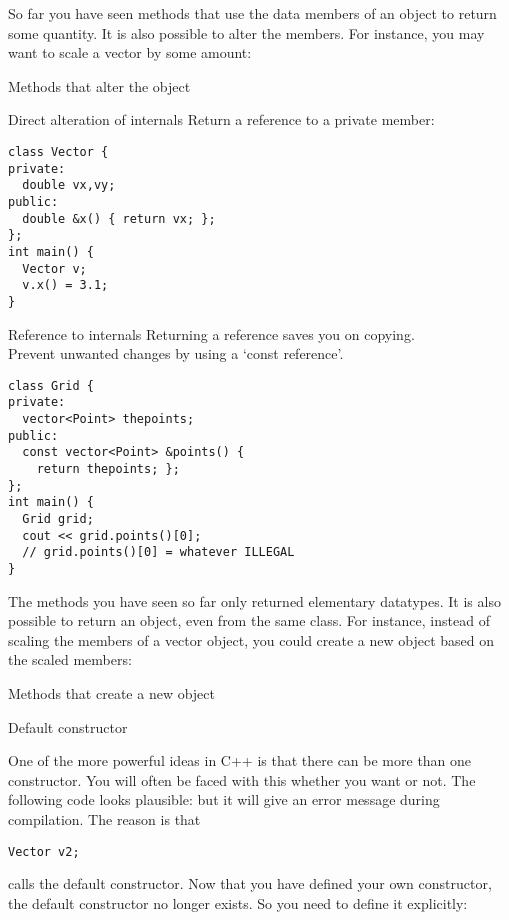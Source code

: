 So far you have seen methods that use the data members of an object to
return some quantity. It is also possible to alter the members. 
For instance, you may want to scale a vector by some amount:
%

\begin{slide}{Methods that alter the object}
  \label{sl:obj-func-on}
\end{slide}

\begin{block}{Direct alteration of internals}
  \label{sl:obj-return-ref}
  Return a reference to a private member:
\begin{lstlisting}
class Vector {
private:
  double vx,vy;
public:
  double &x() { return vx; };
};
int main() {
  Vector v;
  v.x() = 3.1;
}
\end{lstlisting}
\end{block}

\begin{block}{Reference to internals}
  \label{sl:obj-return-const-ref}
  Returning a reference saves you on copying.\\
  Prevent unwanted changes by using a `const reference'.
\begin{lstlisting}
class Grid {
private:
  vector<Point> thepoints;
public:
  const vector<Point> &points() {
    return thepoints; };
};
int main() {
  Grid grid;
  cout << grid.points()[0];
  // grid.points()[0] = whatever ILLEGAL
}
\end{lstlisting}
\end{block}

The methods you have seen so far only returned elementary
datatypes. It is also possible to return an object, even from the same
class. For instance, instead of scaling the members of a vector object, you
could create a new object based on the scaled members:
%

\begin{slide}{Methods that create a new object}
  \label{sl:obj-return}
\end{slide}

 {Default constructor}

One of the more powerful ideas in C++ is that there can be more than
one constructor. You will often be faced with this whether you want or
not. The following code looks plausible:
%
%
but it will give an error message during compilation. The reason is
that 
\begin{lstlisting}
Vector v2;
\end{lstlisting}
calls the default constructor. Now that you have defined your own
constructor, the default constructor no longer exists. So you need to
define it explicitly:
%

